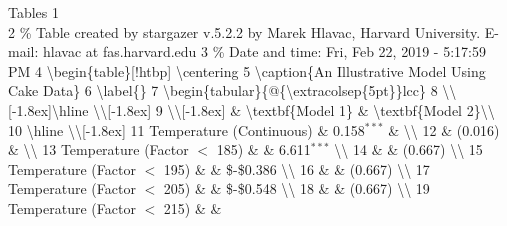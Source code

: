 \documentclass[]{article}
\begin{document}
Tables 1\\
2 \% Table created by stargazer v.5.2.2 by Marek Hlavac, Harvard
University. E-mail: hlavac at fas.harvard.edu 3 \% Date and time: Fri,
Feb 22, 2019 - 5:17:59 PM 4 \textbackslash{}begin\{table\}{[}!htbp{]}
\textbackslash{}centering 5 \textbackslash{}caption\{An Illustrative
Model Using Cake Data\} 6 \textbackslash{}label\{\} 7
\textbackslash{}begin\{tabular\}\{@\{\textbackslash{}extracolsep\{5pt\}\}lcc\}
8 \textbackslash{}\textbackslash{}{[}-1.8ex{]}\textbackslash{}hline
\textbackslash{}\textbackslash{}{[}-1.8ex{]} 9
\textbackslash{}\textbackslash{}{[}-1.8ex{]} \&
\textbackslash{}textbf\{Model 1\} \& \textbackslash{}textbf\{Model
2\}\textbackslash{}\textbackslash{} 10 \textbackslash{}hline
\textbackslash{}\textbackslash{}{[}-1.8ex{]} 11 Temperature (Continuous)
\& 0.158\(^{***}\) \& \textbackslash{}\textbackslash{} 12 \& (0.016) \&
\textbackslash{}\textbackslash{} 13 Temperature (Factor \(<\) 185) \& \&
6.611\(^{***}\) \textbackslash{}\textbackslash{} 14 \& \& (0.667)
\textbackslash{}\textbackslash{} 15 Temperature (Factor \(<\) 195) \& \&
\$-\$0.386 \textbackslash{}\textbackslash{} 16 \& \& (0.667)
\textbackslash{}\textbackslash{} 17 Temperature (Factor \(<\) 205) \& \&
\$-\$0.548 \textbackslash{}\textbackslash{} 18 \& \& (0.667)
\textbackslash{}\textbackslash{} 19 Temperature (Factor \(<\) 215) \& \&
\end{document}
